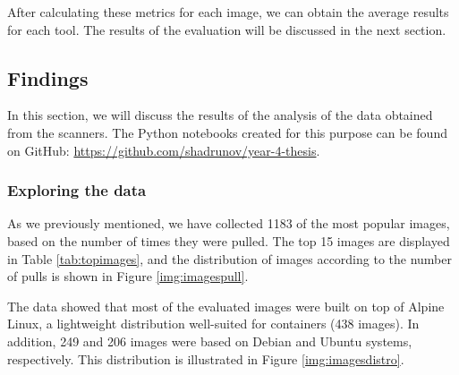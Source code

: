 After calculating these metrics for each image, we can obtain the average results for each tool. The results of the evaluation will be discussed in the next section.

\FloatBarrier
\clearpage

\subsection{Findings}

In this section, we will discuss the results of the analysis of the data obtained from the scanners. The Python notebooks created for this purpose can be found on GitHub: \url{https://github.com/shadrunov/year-4-thesis}.

\subsubsection{Exploring the data}

As we previously mentioned, we have collected 1183 of the most popular images, based on the number of times they were pulled. The top 15 images are displayed in Table \ref{tab:topimages}, and the distribution of images according to the number of pulls is shown in Figure \ref{img:imagespull}. 

The data showed that most of the evaluated images were built on top of Alpine Linux, a lightweight distribution well-suited for containers (438 images). In addition, 249 and 206 images were based on Debian and Ubuntu systems, respectively. This distribution is illustrated in Figure \ref{img:imagesdistro}.


